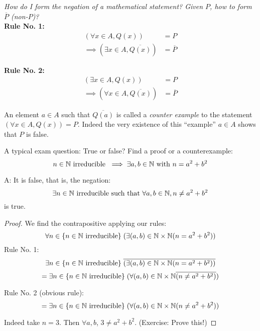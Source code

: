 \documentclass[twoside]{scrartcl}
\begin{document}
\emph{How}
\emph{ do I form the negation of a mathematical statement? Given $P$, how to form $\overline{P}$ (non-$P$)?}\\

\textbf{Rule No. 1:}
\[
\begin{aligned}
  (\forall x \in A, Q(x)) &= P\\
  \implies (\exists x \in A, \overline{Q(x)}) &= \overline{P}
\end{aligned}
\]

\textbf{Rule No. 2: }
\[
\begin{aligned}
  (\exists x \in A, Q(x)) &= P\\
  \implies (\forall x \in A, \overline{Q(x)}) &= \overline{P}
\end{aligned}
\]\vspace*{5pt}

\begin{remark} 
An element $a \in A$ such that $\overline{Q(a)}$ is called a \emph{counter example} to the statement $(\forall x \in A, Q(x)) = P$. Indeed the very existence of this ``example'' $a \in A$ shows that $P$ is false. 	
\end{remark}\vspace*{10pt}

\begin{example}
 A typical exam question: True or false? Find a proof or a counterexample: 
\[n \in \mathbb{N} \text{ irreducible } \implies \exists a,b \in\mathbb{N} \text{ with } n = a^2 + b^2\]	

A: It is false, that is, the negation: 
\[\exists n\in\mathbb{N} \text{ irreducible  such that } \forall a,b \in\mathbb{N}, n \neq a^2 + b^2\]
is true. 

\begin{proof} 
We find the contrapositive applying our rules: 
\[\forall n \in \{n \in\mathbb{N} \text{ irreducible}\}\; (\exists (a,b) \in \mathbb{N} \times \mathbb{N} (n = a^2 + b^2))\]
  Rule No. 1: 
\[\exists n \in \{n \in\mathbb{N} \text{ irreducible}\}\; \overline{(\exists (a,b) \in \mathbb{N} \times \mathbb{N} (n = a^2 + b^2))}\]
\[=\exists n \in \{n \in\mathbb{N} \text{ irreducible}\}\; (\forall (a,b) \in \mathbb{N} \times \mathbb{N} \overline{(n \neq a^2 + b^2)})\]

  Rule No. 2 (obvious rule): 
\[=\exists n \in \{n \in\mathbb{N} \text{ irreducible}\}\; (\forall (a,b) \in \mathbb{N} \times \mathbb{N} (n \neq a^2 + b^2))\]

Indeed take $n = 3$. Then $\forall a,b$, $3 \neq a^2 + b^2$. (Exercise: Prove this!)
\end{proof}
\end{example}
\end{document}
